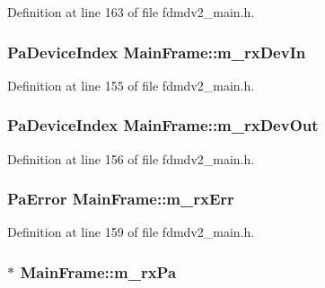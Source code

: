 Definition at line 163 of file fdmdv2\-\_\-main.\-h.

\hypertarget{class_main_frame_ab9d54920598f48bdbfa67161b3167b11}{
\subsubsection[{m\-\_\-rx\-Dev\-In}]{\setlength{\rightskip}{0pt plus 5cm}Pa\-Device\-Index Main\-Frame\-::m\-\_\-rx\-Dev\-In}}\label{class_main_frame_ab9d54920598f48bdbfa67161b3167b11}


Definition at line 155 of file fdmdv2\-\_\-main.\-h.

\hypertarget{class_main_frame_aa73d0adbbf4fe9f2d14778ad1474a3d3}{
\subsubsection[{m\-\_\-rx\-Dev\-Out}]{\setlength{\rightskip}{0pt plus 5cm}Pa\-Device\-Index Main\-Frame\-::m\-\_\-rx\-Dev\-Out}}\label{class_main_frame_aa73d0adbbf4fe9f2d14778ad1474a3d3}


Definition at line 156 of file fdmdv2\-\_\-main.\-h.

\hypertarget{class_main_frame_a9410cdbd4251567ae01c77d8e7bd505b}{
\subsubsection[{m\-\_\-rx\-Err}]{\setlength{\rightskip}{0pt plus 5cm}Pa\-Error Main\-Frame\-::m\-\_\-rx\-Err}}\label{class_main_frame_a9410cdbd4251567ae01c77d8e7bd505b}


Definition at line 159 of file fdmdv2\-\_\-main.\-h.

\hypertarget{class_main_frame_abe7ab65d044b37b6973ed849bcd2759b}{
\subsubsection[{m\-\_\-rx\-Pa}]{$\ast$ Main\-Frame\-::m\-\_\-rx\-Pa}}\label{class_main_frame_abe7ab65d044b37b6973ed849bcd2759b}


